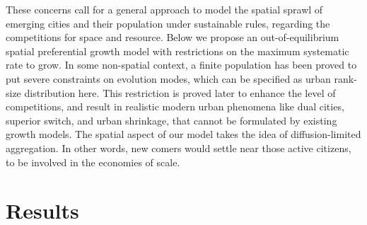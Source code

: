 \documentclass[reprint,unsortedaddress,amsmath,amssymb,aps,prl,showkeys]{revtex4-2}
\begin{document}


These concerns call for a general approach to model the spatial sprawl of emerging cities and their population under sustainable rules, regarding the competitions for space and resource. Below we propose an out-of-equilibrium spatial preferential growth model with restrictions on the maximum systematic rate to grow. In some non-spatial context\cite{PhysRevE.55.R3817}, a finite population has been proved to put severe constraints on evolution modes, which can be specified as urban rank-size distribution here. This restriction is proved later to enhance the level of competitions, and result in realistic modern urban phenomena like dual cities\cite{silverman2018rethinking}, superior switch\cite{gabaix2004evolution}, and urban shrinkage\cite{haase2014conceptualizing}, that cannot be formulated by existing growth models. The spatial aspect of our model takes the idea of diffusion-limited aggregation\cite{makse1995modelling, rybski2013distance}. In other words, new comers would settle near those active citizens, to be involved in the economies of scale\cite{kleinberg2000navigation}.

\section{Results}
\end{document}
